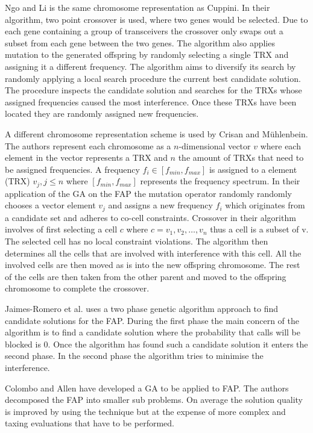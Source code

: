 Ngo and Li\cite{GANgoLi} is the same chromosome representation as Cuppini\cite{GACuppini}. In their algorithm, two point crossover is used, where two genes would be selected. Due to each gene containing a group of transceivers the crossover only swaps out a subset from each gene between the two genes. The algorithm also applies mutation to the generated offspring by randomly selecting a single TRX and assigning it a different frequency. The algorithm aims to diversify its search by randomly applying a local search procedure the current best candidate solution. The procedure inspects the candidate solution and searches for the TRXs whose assigned frequencies caused the most interference. Once these TRXs have been located they are randomly assigned new frequencies.

A different chromosome representation scheme is used by Crisan and M\"uhlenbein\cite{GACrisan}. The authors represent each chromosome as a $n$-dimensional vector $v$ where each element in the vector represents a TRX and $n$ the amount of TRXs that need to be assigned frequencies. A frequency $f_i \in [f_{min}, f_{max}]$ is assigned to a element (TRX) $v_j, j \le n$ where $[f_{min}, f_{max}]$ represents the frequency spectrum. In their application of the \gls{GA} on the FAP the mutation operator randomly randomly chooses a vector element $v_j$ and assigns a new frequency $f_i$ which originates from a candidate set and adheres to co-cell constraints. Crossover in their algorithm involves of first selecting a cell $c$ where $c = {v_1,v_2,\dots,v_n}$ thus a cell is a subset of v. The selected cell has no local constraint violations. The algorithm then determines all the cells that are involved with interference with this cell. All the involved cells are then moved as is into the new offspring chromosome. The rest of the cells are then taken from the other parent and moved to the offspring chromosome to complete the crossover.

Jaimes-Romero et al.\cite{GAJaimes} uses a two phase genetic algorithm approach to find candidate solutions for the \gls{FAP}. During the first phase the main concern of the algorithm is to find a candidate solution where the probability that calls will be blocked is 0. Once the algorithm has found such a candidate solution it enters the second phase. In the second phase the algorithm tries to minimise the interference. 

Colombo and Allen\cite{ProblemDecompMIFAP} have developed a \gls{GA} to be applied to \gls{FAP}. The authors decomposed the \gls{FAP} into smaller sub problems. On average the solution quality is improved by using the technique but at the expense of more complex and taxing evaluations that have to be performed\cite{ProblemDecompMIFAP}. 

